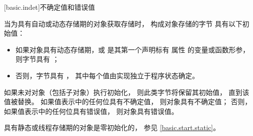 [basic.indet]{不确定值和错误值}

\pnum
当为具有自动或动态存储期的对象获取存储时，
构成对象存储的字节
具有以下初始值：
\begin{itemize}
\item
如果对象具有动态存储期，或
是其第一个声明标有
\tcode{[[indeterminate]]} 属性 的变量或函数形参，
则字节具有 ；
\item
否则，字节具有 ，
其中每个值由实现独立于程序状态确定。
\end{itemize}
如果未对对象（包括子对象）执行初始化，
则此类字节将保留其初始值，
直到该值被替换。
如果值表示中的任何位具有不确定值，
则对象具有不确定值；
否则，如果值表示中的任何位具有错误值，
则对象具有错误值。
\begin{note}
具有静态或线程存储期的对象是零初始化的，
参见 \ref{basic.start.static}。
\end{note}

